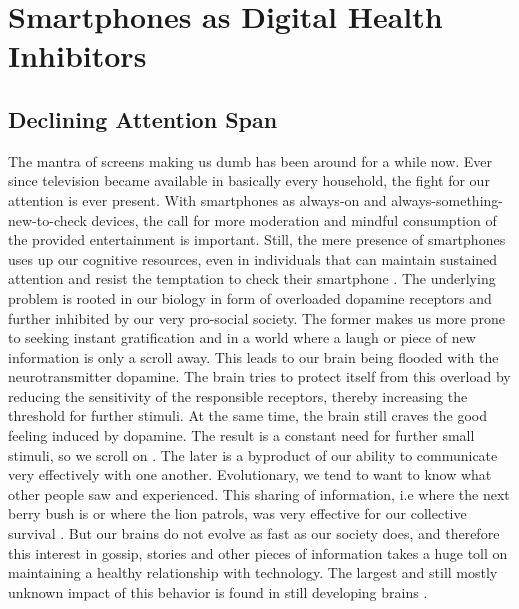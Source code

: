 \section{Smartphones as Digital Health Inhibitors}
\label{sec:smartphoneIssues}
\subsection{Declining Attention Span}
The mantra of screens making us dumb has been around for a while now. Ever since television became available in basically every household, the fight for our attention is ever present. With smartphones as always-on and always-something-new-to-check devices, the call for more moderation and mindful consumption of the provided entertainment is important. Still, the mere presence of smartphones uses up our cognitive resources, even in individuals that can maintain sustained attention and resist the temptation to check their smartphone \cite{ward2017brain}. The underlying problem is rooted in our biology in form of overloaded dopamine receptors and further inhibited by our very pro-social society. The former makes us more prone to seeking instant gratification and in a world where a laugh or piece of new information is only a scroll away. This leads to our brain being flooded with the neurotransmitter dopamine. The brain tries to protect itself from this overload by reducing the sensitivity of the responsible receptors, thereby increasing the threshold for further stimuli. At the same time, the brain still craves the good feeling induced by dopamine. The result is a constant need for further small stimuli, so we scroll on \cite{nieoullon2002dopamine,dopamineRole}. The later is a byproduct of our ability to communicate very effectively with one another. Evolutionary, we tend to want to know what other people saw and experienced. This sharing of information, i.e where the next berry bush is or where the lion patrols, was very effective for our collective survival \cite{sapiens}. But our brains do not evolve as fast as our society does, and therefore this interest in gossip, stories and other pieces of information takes a huge toll on maintaining a healthy relationship with technology. The largest and still mostly unknown impact of this behavior is found in still developing brains \cite{crone2018media}.

